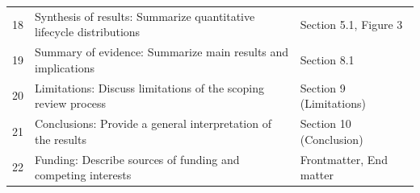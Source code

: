 \documentclass[3p,times]{elsarticle}
\begin{document}
\begin{table}[h]
\begin{tabularx}{\textwidth}{lXl}
18 & Synthesis of results: Summarize quantitative lifecycle distributions & Section 5.1, Figure 3 \\
19 & Summary of evidence: Summarize main results and implications & Section 8.1 \\
20 & Limitations: Discuss limitations of the scoping review process & Section 9 (Limitations) \\
21 & Conclusions: Provide a general interpretation of the results & Section 10 (Conclusion) \\
22 & Funding: Describe sources of funding and competing interests & Frontmatter, End matter \\
\bottomrule
\end{tabularx}
\end{table}
\end{document}
